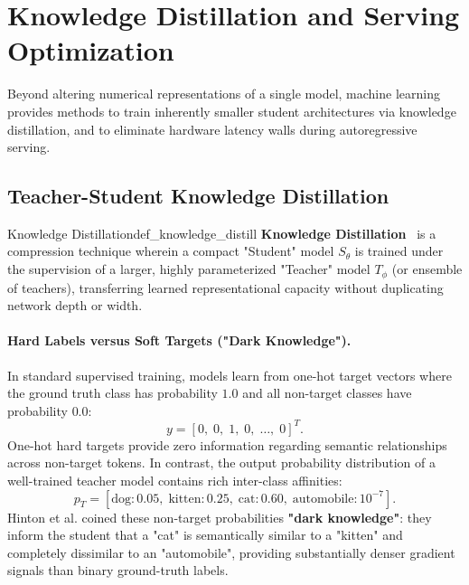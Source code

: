 \documentclass[../../../main.tex]{subfiles}
\begin{document}
\section{Knowledge Distillation and Serving Optimization}
\label{sec:distillation_serving_optimization}

Beyond altering numerical representations of a single model, machine learning provides methods to train inherently smaller student architectures via knowledge distillation, and to eliminate hardware latency walls during autoregressive serving.

\subsection{Teacher-Student Knowledge Distillation}
\label{subsec:teacher_student_distillation}

\begin{definition}{Knowledge Distillation}{def_knowledge_distill}
\textbf{Knowledge Distillation}~\citep{hinton2015distilling} is a compression technique wherein a compact "Student" model $S_\theta$ is trained under the supervision of a larger, highly parameterized "Teacher" model $T_\phi$ (or ensemble of teachers), transferring learned representational capacity without duplicating network depth or width.
\end{definition}

\paragraph{Hard Labels versus Soft Targets ("Dark Knowledge").}
In standard supervised training, models learn from one-hot target vectors where the ground truth class has probability $1.0$ and all non-target classes have probability $0.0$:
\begin{equation}
y = [0, \; 0, \; 1, \; 0, \; \dots, \; 0]^T.
\end{equation}
One-hot hard targets provide zero information regarding semantic relationships across non-target tokens. In contrast, the output probability distribution of a well-trained teacher model contains rich inter-class affinities:
\begin{equation}
p_T = [\text{dog}: 0.05, \; \text{kitten}: 0.25, \; \text{cat}: 0.60, \; \text{automobile}: 10^{-7}].
\end{equation}
Hinton et al. coined these non-target probabilities \textbf{"dark knowledge"}: they inform the student that a "cat" is semantically similar to a "kitten" and completely dissimilar to an "automobile", providing substantially denser gradient signals than binary ground-truth labels.
\end{document}

